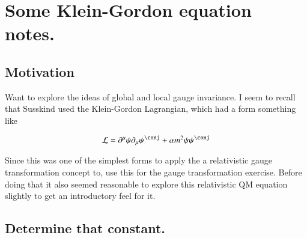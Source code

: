 
%
%




\chapter{Some Klein-Gordon equation notes. }
\label{chap:kleinGordon}
\date{ March 27, 2009.  $RCSfile: kleinGordon.tex,v $ Last $Revision: 1.19 $ $Date: 2009/06/14 23:51:45 $ }

%

\section{Motivation }

Want to explore the ideas of global and local gauge invariance.  I seem to recall that Susskind
used the Klein-Gordon Lagrangian, which had a form something like

\begin{align}\label{eqn:klein_gordon:densityUndeterminedCoeff}
\LL = \partial^\mu \psi \partial_\mu \psi^\conj + \alpha m^2 \psi \psi^\conj
\end{align}

Since this was one of the simplest forms to apply the
a relativistic gauge transformation concept to, use this for the gauge transformation exercise.  Before doing that it also seemed reasonable to
explore this relativistic QM equation slightly to get an introductory feel for it.

\section{Determine that constant. }

